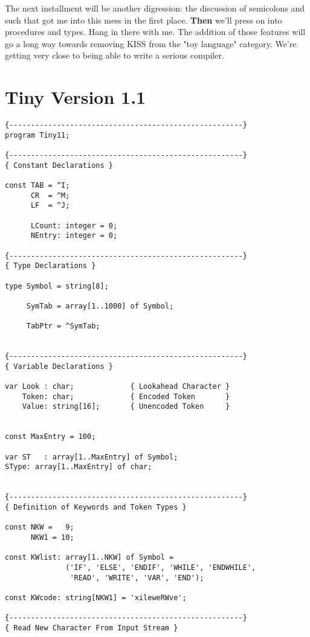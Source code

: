 The next installment will be another  digression:  the discussion of  semicolons  and  such that got me into this mess in the first place. {\bfseries Then} we'll press on  into  procedures and types. Hang in there with me. The addition of those features will go a long way towards removing KISS from  the  "toy  language" category. We're getting very close to being able to write a serious compiler.

\section{Tiny Version 1.1}

\begin{verbatim}
{------------------------------------------------------}
program Tiny11;

{------------------------------------------------------}
{ Constant Declarations }

const TAB = ^I;
      CR  = ^M;
      LF  = ^J;

      LCount: integer = 0;
      NEntry: integer = 0;

{------------------------------------------------------}
{ Type Declarations }

type Symbol = string[8];

     SymTab = array[1..1000] of Symbol;

     TabPtr = ^SymTab;


{------------------------------------------------------}
{ Variable Declarations }

var Look : char;             { Lookahead Character }
    Token: char;             { Encoded Token       }
    Value: string[16];       { Unencoded Token     }


const MaxEntry = 100;

var ST   : array[1..MaxEntry] of Symbol;
SType: array[1..MaxEntry] of char;


{------------------------------------------------------}
{ Definition of Keywords and Token Types }

const NKW =   9;
      NKW1 = 10;

const KWlist: array[1..NKW] of Symbol =
              ('IF', 'ELSE', 'ENDIF', 'WHILE', 'ENDWHILE',
               'READ', 'WRITE', 'VAR', 'END');

const KWcode: string[NKW1] = 'xileweRWve';

{------------------------------------------------------}
{ Read New Character From Input Stream }


\end{verbatim}
